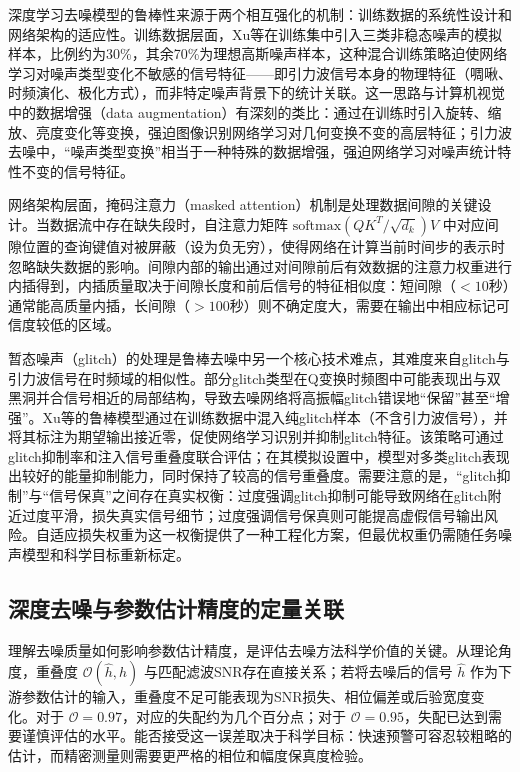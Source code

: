 深度学习去噪模型的鲁棒性来源于两个相互强化的机制：训练数据的系统性设计和网络架构的适应性。训练数据层面，Xu等在训练集中引入三类非稳态噪声的模拟样本，比例约为30\%，其余70\%为理想高斯噪声样本，这种混合训练策略迫使网络学习对噪声类型变化不敏感的信号特征——即引力波信号本身的物理特征（啁啾、时频演化、极化方式），而非特定噪声背景下的统计关联。这一思路与计算机视觉中的数据增强（data augmentation）有深刻的类比：通过在训练时引入旋转、缩放、亮度变化等变换，强迫图像识别网络学习对几何变换不变的高层特征；引力波去噪中，“噪声类型变换”相当于一种特殊的数据增强，强迫网络学习对噪声统计特性不变的信号特征。

网络架构层面，掩码注意力（masked attention）机制是处理数据间隙的关键设计。当数据流中存在缺失段时，自注意力矩阵 $\mathrm{softmax}(QK^T/\sqrt{d_k})V$ 中对应间隙位置的查询键值对被屏蔽（设为负无穷），使得网络在计算当前时间步的表示时忽略缺失数据的影响。间隙内部的输出通过对间隙前后有效数据的注意力权重进行内插得到，内插质量取决于间隙长度和前后信号的特征相似度：短间隙（$<10$秒）通常能高质量内插，长间隙（$>100$秒）则不确定度大，需要在输出中相应标记可信度较低的区域。

暂态噪声（glitch）的处理是鲁棒去噪中另一个核心技术难点，其难度来自glitch与引力波信号在时频域的相似性。部分glitch类型在Q变换时频图中可能表现出与双黑洞并合信号相近的局部结构，导致去噪网络将高振幅glitch错误地“保留”甚至“增强”。Xu等的鲁棒模型通过在训练数据中混入纯glitch样本（不含引力波信号），并将其标注为期望输出接近零，促使网络学习识别并抑制glitch特征。该策略可通过glitch抑制率和注入信号重叠度联合评估；在其模拟设置中，模型对多类glitch表现出较好的能量抑制能力，同时保持了较高的信号重叠度。需要注意的是，“glitch抑制”与“信号保真”之间存在真实权衡：过度强调glitch抑制可能导致网络在glitch附近过度平滑，损失真实信号细节；过度强调信号保真则可能提高虚假信号输出风险。自适应损失权重为这一权衡提供了一种工程化方案，但最优权重仍需随任务噪声模型和科学目标重新标定。

\subsection{深度去噪与参数估计精度的定量关联}

理解去噪质量如何影响参数估计精度，是评估去噪方法科学价值的关键。从理论角度，重叠度 $\mathcal{O}(\hat{h}, h)$ 与匹配滤波SNR存在直接关系；若将去噪后的信号 $\hat{h}$ 作为下游参数估计的输入，重叠度不足可能表现为SNR损失、相位偏差或后验宽度变化。对于 $\mathcal{O}=0.97$，对应的失配约为几个百分点；对于 $\mathcal{O}=0.95$，失配已达到需要谨慎评估的水平。能否接受这一误差取决于科学目标：快速预警可容忍较粗略的估计，而精密测量则需要更严格的相位和幅度保真度检验。

